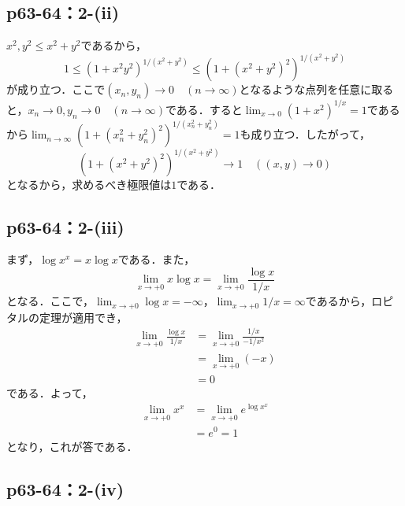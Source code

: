 \documentclass[uplatex,dvipdfmx,a4paper,10pt,fleqn]{jsarticle}
\begin{document}
\subsection*{p63-64：2-(ii)}

  \begin{tleftbar}
    $x^2,y^2 \leq x^2+y^2$であるから，
    \[
      1 \leq (1 + x^2 y^2)^{1/(x^2+y^2)} \leq (1 + (x^2+y^2)^2)^{1/(x^2+y^2)}
    \]
    が成り立つ．ここで$(x_n, y_n) \to 0 \quad (n \to \infty)$となるような点列を任意に取ると，$x_n \to 0, y_n \to 0 \quad (n \to \infty)$である．すると$\lim_{x \to 0} (1+x^2)^{1/x} = 1$であるから$\lim_{n \to \infty} (1 + (x_n^2+y_n^2)^2)^{1/(x_n^2+y_n^2)} = 1$も成り立つ．したがって，
    \[
      (1 + (x^2+y^2)^2)^{1/(x^2+y^2)} \to 1 \quad ((x,y) \to 0)
    \]
    となるから，求めるべき極限値は$1$である．
  \end{tleftbar}


\subsection*{p63-64：2-(iii)}

\begin{tleftbar}
    まず，$\log x^x = x \log x$である．また，
    \[
        \lim_{x \to +0} x \log x  =\lim_{x \to +0} \frac{\log x}{1/x} 
    \]
    となる．ここで，$\lim_{x \to +0} \log x = -\infty$，$\lim_{x \to +0} 1/x =\infty$であるから，ロピタルの定理が適用でき，
    \begin{align*}
        \lim_{x \to +0} \frac{\log x}{1/x} & = \lim_{x \to +0} \frac{1/x}{-1/x^2} \\
        & = \lim_{x \to +0} (-x) \\
        & =0
    \end{align*}
    である．よって，
    \begin{align*}
    \lim_{x \to +0} x^x &= \lim_{x \to +0} e^{\log x^x} \\
    & =e^0 =1
    \end{align*}
    となり，これが答である．
\end{tleftbar}

\subsection*{p63-64：2-(iv)}
\end{document}
